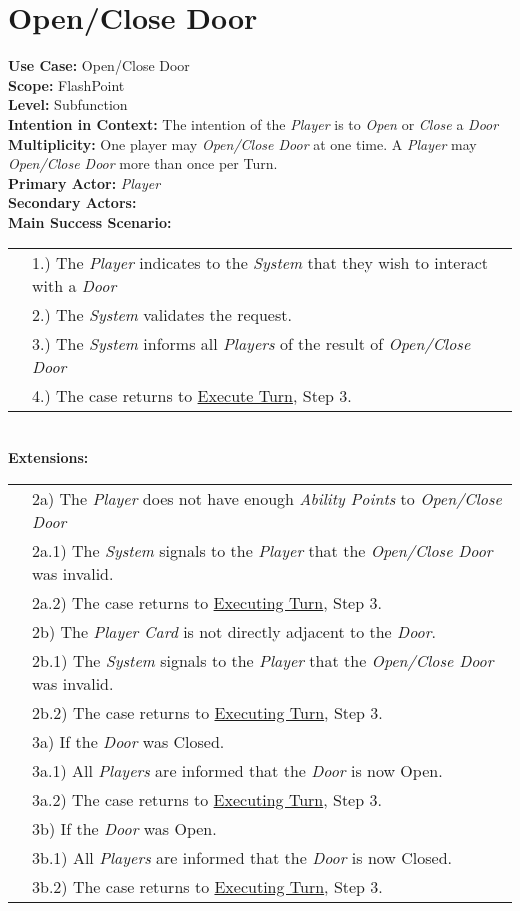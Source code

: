 \documentclass{article}
\begin{document}
	\section*{Open/Close Door}
	\textbf{Use Case:} Open/Close Door\\
	\textbf{Scope:} FlashPoint\\
	\textbf{Level:} Subfunction\\
	\textbf{Intention in Context:} The intention of the \textit{Player} is to \textit{Open} or \textit{Close} a \textit{Door} \\
	\textbf{Multiplicity: } One player may \textit{Open/Close Door} at one time. A \textit{Player} may \textit{Open/Close Door} more than once per Turn.\\
	\textbf{Primary Actor:} \textit{Player}\\
	\textbf{Secondary Actors:}\\
	\textbf{Main Success Scenario:}\\
	\begin{tabular}{l l}
		&1.) The \textit{Player} indicates to the \textit{System} that they wish to interact with a \textit{Door} \\
		&2.) The \textit{System} validates the request. \\
		&3.) The \textit{System} informs all \textit{Players} of the result of \textit{Open/Close Door}\\
		&4.) The case returns to \underline{Execute Turn}, Step 3.\\
	\end{tabular}\\
	\textbf{Extensions: }\\
	\begin{tabular}{l l}
		&2a) The \textit{Player} does not have enough \textit{Ability Points} to \textit{Open/Close Door}\\
		&\qquad2a.1) The \textit{System} signals to the \textit{Player} that the \textit{Open/Close Door} was invalid.\\ 
		&\qquad2a.2) The case returns to \underline{Executing Turn}, Step 3.\\
		&2b) The \textit{Player Card} is not directly adjacent to the \textit{Door}.\\
		&\qquad2b.1) The \textit{System} signals to the \textit{Player} that the \textit{Open/Close Door} was invalid.\\ 
		&\qquad2b.2) The case returns to \underline{Executing Turn}, Step 3.\\
		&3a) If the \textit{Door} was Closed.\\
		&\qquad3a.1) All \textit{Players} are informed that the \textit{Door} is now Open.\\
		&\qquad3a.2) The case returns to \underline{Executing Turn}, Step 3.\\
		&3b) If the \textit{Door} was Open.\\
		&\qquad3b.1) All \textit{Players} are informed that the \textit{Door} is now Closed.\\
		&\qquad3b.2) The case returns to \underline{Executing Turn}, Step 3.\\
	\end{tabular}
	
\end{document}
